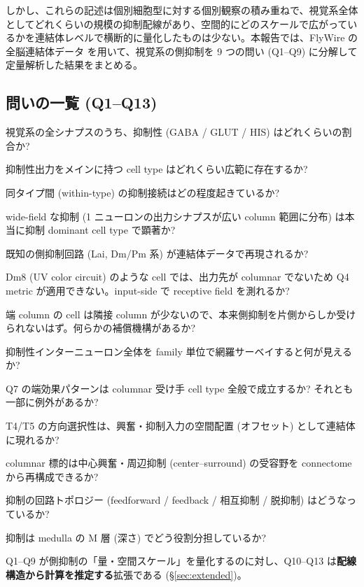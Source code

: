 \documentclass[11pt,a4paper]{ltjsarticle}
\begin{document}
しかし、これらの記述は個別細胞型に対する個別観察の積み重ねで、視覚系全体としてどれくらいの規模の抑制配線があり、空間的にどのスケールで広がっているかを連結体レベルで横断的に量化したものは少ない。本報告では、FlyWire の全脳連結体データ \cite{flywire2024} を用いて、視覚系の側抑制を 9 つの問い (Q1--Q9) に分解して定量解析した結果をまとめる。

\subsection*{問いの一覧 (Q1--Q13)}

\begin{description}[leftmargin=2em, style=nextline]
\item[Q1] 視覚系の全シナプスのうち、抑制性 (GABA / GLUT / HIS) はどれくらいの割合か?
\item[Q2] 抑制性出力をメインに持つ cell type はどれくらい広範に存在するか?
\item[Q3] 同タイプ間 (within-type) の抑制接続はどの程度起きているか?
\item[Q4] wide-field な抑制 (1 ニューロンの出力シナプスが広い column 範囲に分布) は本当に抑制 dominant cell type で顕著か?
\item[Q5] 既知の側抑制回路 (Lai, Dm/Pm 系) が連結体データで再現されるか?
\item[Q6] Dm8 (UV color circuit) のような cell では、出力先が columnar でないため Q4 metric が適用できない。input-side で receptive field を測れるか?
\item[Q7] 端 column の cell は隣接 column が少ないので、本来側抑制を片側からしか受けられないはず。何らかの補償機構があるか?
\item[Q8] 抑制性インターニューロン全体を family 単位で網羅サーベイすると何が見えるか?
\item[Q9] Q7 の端効果パターンは columnar 受け手 cell type 全般で成立するか? それとも一部に例外があるか?
\item[Q10] T4/T5 の方向選択性は、興奮・抑制入力の空間配置 (オフセット) として連結体に現れるか?
\item[Q11] columnar 標的は中心興奮・周辺抑制 (center--surround) の受容野を connectome から再構成できるか?
\item[Q12] 抑制の回路トポロジー (feedforward / feedback / 相互抑制 / 脱抑制) はどうなっているか?
\item[Q13] 抑制は medulla の M 層 (深さ) でどう役割分担しているか?
\end{description}

Q1--Q9 が側抑制の「量・空間スケール」を量化するのに対し、Q10--Q13 は\textbf{配線構造から計算を推定する}拡張である (\S\ref{sec:extended})。
\end{document}
